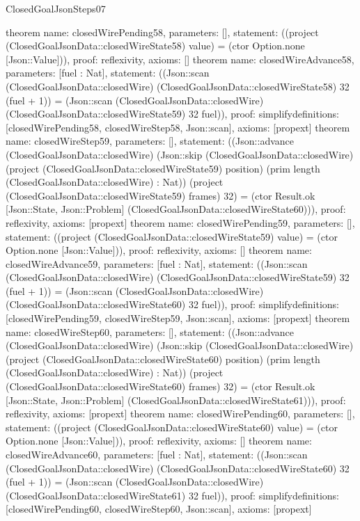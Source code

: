 \begin{lexlean}{ClosedGoalJsonSteps07}
\begin{semanticmodule}
{}
theorem{
 name: closedWirePending58, parameters: [],
 statement: ((project (ClosedGoalJsonData::closedWireState58) value) = (ctor Option.none [Json::Value])), proof: reflexivity{}, axioms: []
}
theorem{
 name: closedWireAdvance58, parameters: [fuel : Nat],
 statement: ((Json::scan (ClosedGoalJsonData::closedWire) (ClosedGoalJsonData::closedWireState58) 32 (fuel + 1)) = (Json::scan (ClosedGoalJsonData::closedWire) (ClosedGoalJsonData::closedWireState59) 32 fuel)), proof: simplify{definitions: [closedWirePending58, closedWireStep58, Json::scan]}, axioms: [propext]
}
theorem{
 name: closedWireStep59, parameters: [],
 statement: ((Json::advance (ClosedGoalJsonData::closedWire) (Json::skip (ClosedGoalJsonData::closedWire) (project (ClosedGoalJsonData::closedWireState59) position) (prim length (ClosedGoalJsonData::closedWire) : Nat)) (project (ClosedGoalJsonData::closedWireState59) frames) 32) = (ctor Result.ok [Json::State, Json::Problem] (ClosedGoalJsonData::closedWireState60))), proof: reflexivity{}, axioms: [propext]
}
theorem{
 name: closedWirePending59, parameters: [],
 statement: ((project (ClosedGoalJsonData::closedWireState59) value) = (ctor Option.none [Json::Value])), proof: reflexivity{}, axioms: []
}
theorem{
 name: closedWireAdvance59, parameters: [fuel : Nat],
 statement: ((Json::scan (ClosedGoalJsonData::closedWire) (ClosedGoalJsonData::closedWireState59) 32 (fuel + 1)) = (Json::scan (ClosedGoalJsonData::closedWire) (ClosedGoalJsonData::closedWireState60) 32 fuel)), proof: simplify{definitions: [closedWirePending59, closedWireStep59, Json::scan]}, axioms: [propext]
}
theorem{
 name: closedWireStep60, parameters: [],
 statement: ((Json::advance (ClosedGoalJsonData::closedWire) (Json::skip (ClosedGoalJsonData::closedWire) (project (ClosedGoalJsonData::closedWireState60) position) (prim length (ClosedGoalJsonData::closedWire) : Nat)) (project (ClosedGoalJsonData::closedWireState60) frames) 32) = (ctor Result.ok [Json::State, Json::Problem] (ClosedGoalJsonData::closedWireState61))), proof: reflexivity{}, axioms: [propext]
}
theorem{
 name: closedWirePending60, parameters: [],
 statement: ((project (ClosedGoalJsonData::closedWireState60) value) = (ctor Option.none [Json::Value])), proof: reflexivity{}, axioms: []
}
theorem{
 name: closedWireAdvance60, parameters: [fuel : Nat],
 statement: ((Json::scan (ClosedGoalJsonData::closedWire) (ClosedGoalJsonData::closedWireState60) 32 (fuel + 1)) = (Json::scan (ClosedGoalJsonData::closedWire) (ClosedGoalJsonData::closedWireState61) 32 fuel)), proof: simplify{definitions: [closedWirePending60, closedWireStep60, Json::scan]}, axioms: [propext]
}
\end{semanticmodule}
\end{lexlean}
